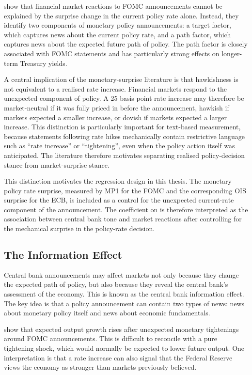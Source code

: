 \citet{gurkaynak2005} show that financial market reactions to FOMC
announcements cannot be explained by the surprise change in the current
policy rate alone. Instead, they identify two components of monetary
policy announcements: a target factor, which captures news about the
current policy rate, and a path factor, which captures news about the
expected future path of policy. The path factor is closely associated
with FOMC statements and has particularly strong effects on longer-term
Treasury yields.

A central implication of the monetary-surprise literature is that
hawkishness is not equivalent to a realised rate increase. Financial
markets respond to the unexpected component of policy. A 25 basis point
rate increase may therefore be market-neutral if it was fully priced in
before the announcement, hawkish if markets expected a smaller increase,
or dovish if markets expected a larger increase. This distinction is
particularly important for text-based measurement, because statements
following rate hikes mechanically contain restrictive language such as
``rate increase'' or ``tightening'', even when the policy action itself
was anticipated. The literature therefore motivates separating realised
policy-decision stance from market-surprise stance.

This distinction motivates the regression design in this thesis. The
monetary policy rate surprise, measured by MP1 for the FOMC and the
corresponding OIS surprise for the ECB, is included as a control for the
unexpected current-rate component of the announcement. The coefficient
on \netscore{} is therefore interpreted as the association between
central bank tone and market reactions after controlling for the
mechanical surprise in the policy-rate decision.

\subsection{The Information Effect}

Central bank announcements may affect markets not only because they
change the expected path of policy, but also because they reveal the
central bank's assessment of the economy. This is known as the central
bank information effect. The key idea is that a policy announcement can
contain two types of news: news about monetary policy itself and news
about economic fundamentals.

\citet{nakamura2018} show that expected output growth rises after
unexpected monetary tightenings around FOMC announcements. This is
difficult to reconcile with a pure tightening shock, which would normally
be expected to lower future output. One interpretation is that a rate
increase can also signal that the Federal Reserve views the economy as
stronger than markets previously believed.

